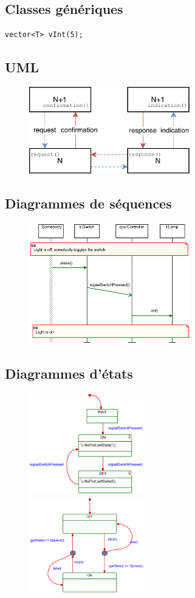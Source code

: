 \documentclass[resume]{subfiles}
\begin{document}
\subsection{Classes génériques}
\begin{lstlisting}[style=Cpp]
vector<T> vInt(5);
\end{lstlisting}
\subsection{UML}
\begin{figure}[H]
\centering
\includegraphics[width=7cm,page=2]{Schemas-crop.pdf}
\end{figure}
\subsection{Diagrammes de séquences}
\begin{figure}[H]
\centering
\includegraphics[width=7cm]{img_0.pdf}
\end{figure}
\subsection{Diagrammes d'états}
\begin{figure}[H]
\centering
\includegraphics[width=5cm]{img_1.pdf}\\
\includegraphics[width=5cm]{img_2.pdf}
\end{figure}
\end{document}
